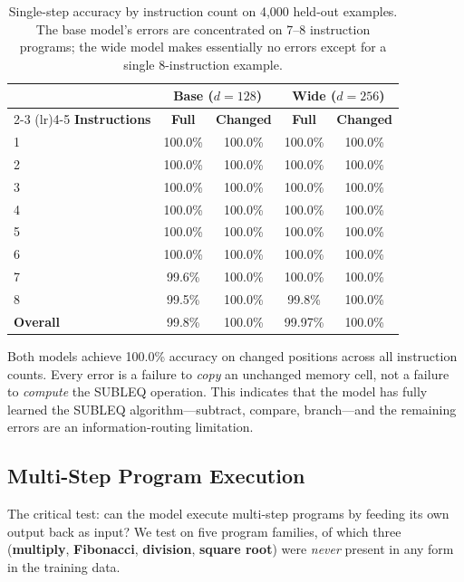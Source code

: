 \documentclass[11pt,a4paper]{article}
\begin{document}
\begin{table}[h]
\centering
\caption{Single-step accuracy by instruction count on 4{,}000 held-out examples. The base model's errors are concentrated on 7--8 instruction programs; the wide model makes essentially no errors except for a single 8-instruction example.}
\label{tab:single_step}
\begin{tabular}{lcccc}
\toprule
 & \multicolumn{2}{c}{\textbf{Base ($d{=}128$)}} & \multicolumn{2}{c}{\textbf{Wide ($d{=}256$)}} \\
\cmidrule(lr){2-3} \cmidrule(lr){4-5}
\textbf{Instructions} & \textbf{Full} & \textbf{Changed} & \textbf{Full} & \textbf{Changed} \\
\midrule
1 & 100.0\% & 100.0\% & 100.0\% & 100.0\% \\
2 & 100.0\% & 100.0\% & 100.0\% & 100.0\% \\
3 & 100.0\% & 100.0\% & 100.0\% & 100.0\% \\
4 & 100.0\% & 100.0\% & 100.0\% & 100.0\% \\
5 & 100.0\% & 100.0\% & 100.0\% & 100.0\% \\
6 & 100.0\% & 100.0\% & 100.0\% & 100.0\% \\
7 & 99.6\% & 100.0\% & 100.0\% & 100.0\% \\
8 & 99.5\% & 100.0\% & 99.8\% & 100.0\% \\
\midrule
\textbf{Overall} & 99.8\% & 100.0\% & 99.97\% & 100.0\% \\
\bottomrule
\end{tabular}
\end{table}

\begin{observation}
Both models achieve 100.0\% accuracy on changed positions across all instruction counts.
Every error is a failure to \emph{copy} an unchanged memory cell, not a failure to \emph{compute} the SUBLEQ operation.
This indicates that the model has fully learned the SUBLEQ algorithm---subtract, compare, branch---and the remaining errors are an information-routing limitation.
\end{observation}

\subsection{Multi-Step Program Execution}

The critical test: can the model execute multi-step programs by feeding its own output back as input?
We test on five program families, of which three (\textbf{multiply}, \textbf{Fibonacci}, \textbf{division}, \textbf{square root}) were \emph{never} present in any form in the training data.
\end{document}
